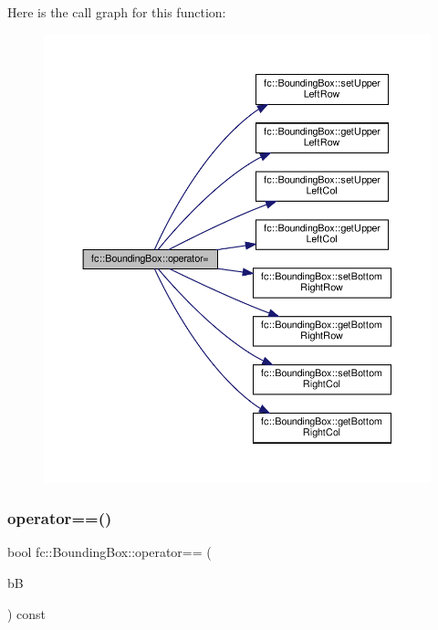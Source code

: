 Here is the call graph for this function\+:
\nopagebreak
\begin{figure}[H]
\begin{center}
\leavevmode
\includegraphics[width=350pt]{db/dc1/classfc_1_1BoundingBox_a80e775cb93499c77462ea281d9740f74_cgraph}
\end{center}
\end{figure}
\mbox{\label{classfc_1_1BoundingBox_a2a1f28a0e0cd0a8b6041ba8e9c0f9b4f}} 
\subsubsection{\texorpdfstring{operator==()}{operator==()}}
{\footnotesize\ttfamily bool fc\+::\+Bounding\+Box\+::operator== (\begin{DoxyParamCaption}\item[{const \hyperlink{classfc_1_1BoundingBox}{Bounding\+Box} \&}]{bB }\end{DoxyParamCaption}) const\hspace{0.3cm}{\ttfamily [inline]}}



